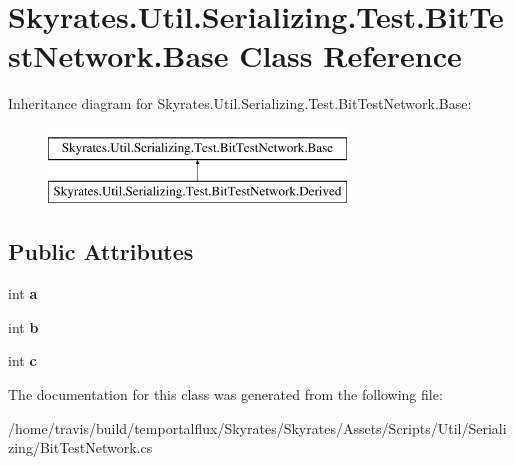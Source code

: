 \hypertarget{class_skyrates_1_1_util_1_1_serializing_1_1_test_1_1_bit_test_network_1_1_base}{\section{Skyrates.\-Util.\-Serializing.\-Test.\-Bit\-Test\-Network.\-Base Class Reference}
\label{class_skyrates_1_1_util_1_1_serializing_1_1_test_1_1_bit_test_network_1_1_base}
}
Inheritance diagram for Skyrates.\-Util.\-Serializing.\-Test.\-Bit\-Test\-Network.\-Base\-:\begin{figure}[H]
\begin{center}
\leavevmode
\includegraphics[height=2.000000cm]{class_skyrates_1_1_util_1_1_serializing_1_1_test_1_1_bit_test_network_1_1_base}
\end{center}
\end{figure}
\subsection*{Public Attributes}
\begin{DoxyCompactItemize}
\item 
\hypertarget{class_skyrates_1_1_util_1_1_serializing_1_1_test_1_1_bit_test_network_1_1_base_adb3079d759028f098ce88641dabdf171}{int {\bfseries a}}\label{class_skyrates_1_1_util_1_1_serializing_1_1_test_1_1_bit_test_network_1_1_base_adb3079d759028f098ce88641dabdf171}

\item 
\hypertarget{class_skyrates_1_1_util_1_1_serializing_1_1_test_1_1_bit_test_network_1_1_base_ae39b2349ee024b3688ce0a10f19e37df}{int {\bfseries b}}\label{class_skyrates_1_1_util_1_1_serializing_1_1_test_1_1_bit_test_network_1_1_base_ae39b2349ee024b3688ce0a10f19e37df}

\item 
\hypertarget{class_skyrates_1_1_util_1_1_serializing_1_1_test_1_1_bit_test_network_1_1_base_afbb07a15a6567b55428d89489e95f45a}{int {\bfseries c}}\label{class_skyrates_1_1_util_1_1_serializing_1_1_test_1_1_bit_test_network_1_1_base_afbb07a15a6567b55428d89489e95f45a}

\end{DoxyCompactItemize}


The documentation for this class was generated from the following file\-:\begin{DoxyCompactItemize}
\item 
/home/travis/build/temportalflux/\-Skyrates/\-Skyrates/\-Assets/\-Scripts/\-Util/\-Serializing/Bit\-Test\-Network.\-cs\end{DoxyCompactItemize}
